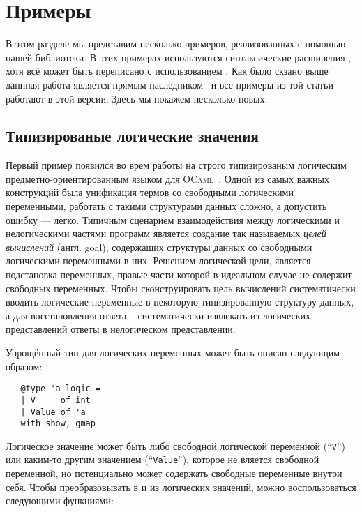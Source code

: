 \section{Примеры}
\label{sec:examples}

В этом разделе мы представим несколько примеров, реализованных с помощью нашей библиотеки. В этих примерах используются синтаксические расширения , хотя всё может быть переписано с использованием . Как было скзано выше даннная работа является прямым наследником~\cite{TransformationObjects} и все примеры из той статьи работают в этой версии. Здесь мы покажем несколько новых.

\subsection{Типизированые логические значения}

Первый пример появился во врем работы на строго типизированым логическим предметно-ориентированным языком для \textsc{OCaml}~\cite{OCanren}. 
Одной из самых важных конструкций была унификация термов со свободными логическими переменными, работать с такими структурами данных сложно, а допустить ошибку --- легко. Типичным сценарием взаимодействия  между логическими и нелогическими частями программ является 
создание так называемых \emph{целей вычислений} (англ. goal), содержащих структуры данных со свободными логическими переменными в них.
Решением логической цели, является подстановка переменных, правые части которой в идеальном случае не содержит свободных переменных. Чтобы
сконструировать цель вычислений систематически вводить логические переменные в некоторую типизированную структуру данных,  а для восстановления ответа -- систематически извлекать из логических представлений ответы в нелогическом представлении.

Упрощённый тип для логических переменных может быть описан следующим образом:

\begin{lstlisting}
   @type 'a logic =
   | V     of int
   | Value of 'a
   with show, gmap
\end{lstlisting}

Логическое значение может быть либо свободной логической переменной (``\lstinline{V}'') или каким-то другим значением (``\lstinline{Value}''), которое не вляется свободной переменной, но потенциально может содержать свободные переменные внутри себя. Чтобы преобразовывать в и из логических значений, можно воспользоваться следующими функциями:

